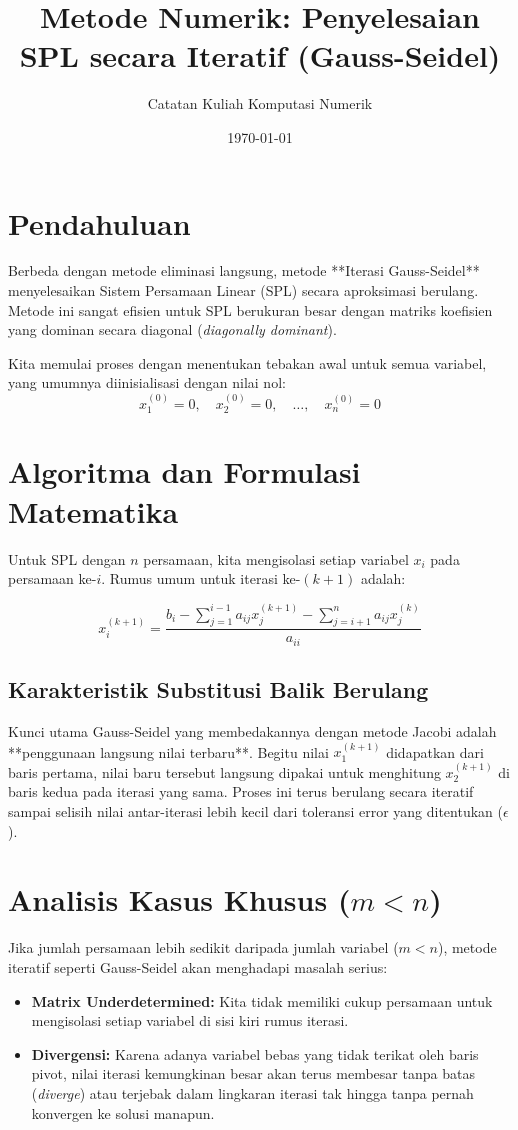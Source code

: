 \documentclass[12pt, lettersize, journal]{article}
\title{\textbf{Metode Numerik: Penyelesaian SPL secara Iteratif (Gauss-Seidel)}}
\author{Catatan Kuliah Komputasi Numerik}
\date{\today}
\begin{document}
\maketitle

\section{Pendahuluan}
Berbeda dengan metode eliminasi langsung, metode **Iterasi Gauss-Seidel** menyelesaikan Sistem Persamaan Linear (SPL) secara aproksimasi berulang. Metode ini sangat efisien untuk SPL berukuran besar dengan matriks koefisien yang dominan secara diagonal (\textit{diagonally dominant}).

Kita memulai proses dengan menentukan tebakan awal untuk semua variabel, yang umumnya diinisialisasi dengan nilai nol:
\begin{equation}
    x_1^{(0)} = 0, \quad x_2^{(0)} = 0, \quad \dots, \quad x_n^{(0)} = 0
\end{equation}

\section{Algoritma dan Formulasi Matematika}
Untuk SPL dengan $n$ persamaan, kita mengisolasi setiap variabel $x_i$ pada persamaan ke-$i$. Rumus umum untuk iterasi ke-$(k+1)$ adalah:

\begin{equation}
    x_i^{(k+1)} = \frac{b_i - \sum_{j=1}^{i-1} a_{ij}x_j^{(k+1)} - \sum_{j=i+1}^{n} a_{ij}x_j^{(k)}}{a_{ii}}
\end{equation}

\subsection{Karakteristik Substitusi Balik Berulang}
Kunci utama Gauss-Seidel yang membedakannya dengan metode Jacobi adalah **penggunaan langsung nilai terbaru**. Begitu nilai $x_1^{(k+1)}$ didapatkan dari baris pertama, nilai baru tersebut langsung dipakai untuk menghitung $x_2^{(k+1)}$ di baris kedua pada iterasi yang sama. Proses ini terus berulang secara iteratif sampai selisih nilai antar-iterasi lebih kecil dari toleransi error yang ditentukan ($\epsilon$).

\section{Analisis Kasus Khusus ($m < n$)}
Jika jumlah persamaan lebih sedikit daripada jumlah variabel ($m < n$), metode iteratif seperti Gauss-Seidel akan menghadapi masalah serius:
\begin{itemize}
    \item \textbf{Matrix Underdetermined:} Kita tidak memiliki cukup persamaan untuk mengisolasi setiap variabel di sisi kiri rumus iterasi.
    \item \textbf{Divergensi:} Karena adanya variabel bebas yang tidak terikat oleh baris pivot, nilai iterasi kemungkinan besar akan terus membesar tanpa batas (\textit{diverge}) atau terjebak dalam lingkaran iterasi tak hingga tanpa pernah konvergen ke solusi manapun.
\end{itemize}
\end{document}

